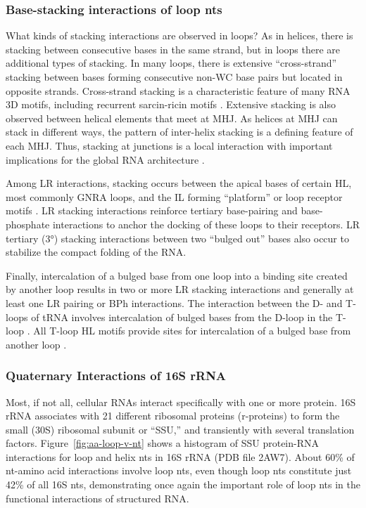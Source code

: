 \subsubsection{Base-stacking interactions of loop nts}

What kinds of stacking interactions are observed in loops? As in helices, there
is stacking between consecutive bases in the same strand, but in loops there are
additional types of stacking. In many loops, there is extensive “cross-strand”
stacking between bases forming consecutive non-WC base pairs but located in
opposite strands. Cross-strand stacking is a characteristic feature of many RNA
3D motifs, including recurrent sarcin-ricin motifs \cite{Szewczak1993a}.
Extensive stacking is also observed between helical elements that meet at MHJ.
As helices at MHJ can stack in different ways, the pattern of inter-helix
stacking is a defining feature of each MHJ. Thus, stacking at junctions is a
local interaction with important implications for the global RNA architecture
\cite{Lescoute2006b}. 

Among LR interactions, stacking occurs between the apical bases of certain HL,
most commonly GNRA loops, and the IL forming ``platform'' or loop receptor motifs
\cite{Cate1996}. LR stacking interactions reinforce tertiary base-pairing and
base-phosphate interactions to anchor the docking of these loops to their
receptors. LR tertiary (3°) stacking interactions between two “bulged out” bases
also occur to stabilize the compact folding of the RNA. 

Finally, intercalation of a bulged base from one loop into a binding site
created by another loop results in two or more LR stacking interactions and
generally at least one LR pairing or BPh interactions. The interaction between
the D- and T-loops of tRNA involves intercalation of bulged bases from the
D-loop in the T-loop \cite{Quigley1976}. All T-loop HL motifs provide sites for
intercalation of a bulged base from another loop \cite{Nagaswamy2002}. 

\subsubsection{Quaternary Interactions of 16S rRNA}

Most, if not all, cellular RNAs interact specifically with one or more protein.
\EC{} 16S rRNA associates with 21 different ribosomal proteins (r-proteins) to
form the small (30S) ribosomal subunit or ``SSU,'' and transiently with several
translation factors. Figure~\ref{fig:aa-loop-v-nt} shows a histogram of SSU
protein-RNA interactions for loop and helix nts in 16S rRNA (PDB file 2AW7).
About 60\% of nt-amino acid interactions involve loop nts, even though loop nts
constitute just 42\% of all 16S nts, demonstrating once again the important role
of loop nts in the functional interactions of structured RNA.

